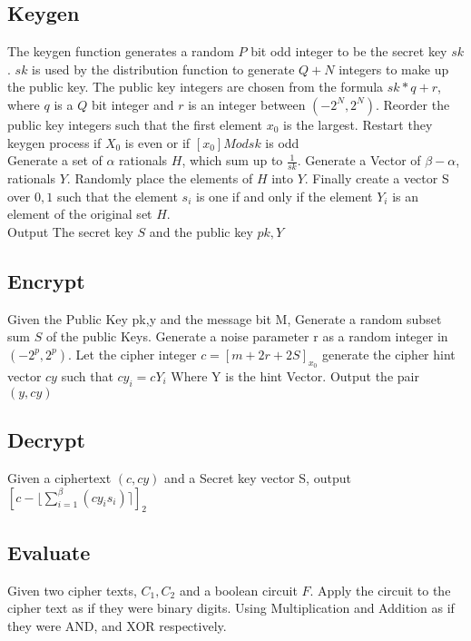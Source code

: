 \documentclass[letterpaper,11pt]{article} %
\begin{document}
\subsection*{Keygen}
The keygen function generates a random $P$ bit odd integer to be the secret key $sk$. $sk$ is used by the distribution function to generate $Q + N$ integers to make up the public key. The public key integers are chosen from
the formula $sk * q + r$, where $q$ is a $Q$ bit integer and $r$ is an integer between $(-2^N, 2^N).$ Reorder the public key integers such that the first element $x_0$ is the largest. Restart they keygen process if $X_0$ is even or if $[x_0] Mod sk$ is odd  \\

Generate a set of $\alpha$ rationals $H$, which sum up to $\frac{1}{sk}$. Generate a Vector of $\beta - \alpha$, rationals $Y.$ Randomly place the elements of $H$ into $Y$. Finally create a vector S over $0,1$ such that the element $s_i$ is one if and only if the element $Y_i$ is an element of the original set $H$.\\

Output The secret key $S$ and the public key $pk,Y$\\

\subsection*{Encrypt}
Given the Public Key pk,y and the message bit M, Generate a random subset sum $S$ of the public Keys. Generate a noise parameter r as a random integer in $(-2^p,2^p)$. Let the cipher integer $c=[m+2r+2S]_{x_0}$ generate the cipher hint vector $cy$ such that $cy_i=cY_i$
Where Y is the hint Vector. Output the pair $(y,cy)$\\

\subsection*{Decrypt}
	Given a ciphertext $(c,cy)$ and a Secret key vector S, output $[c-\lfloor \sum\limits_{i=1}^\beta (cy_is_i) \rceil ]_2$\\
\subsection*{Evaluate}
Given two cipher texts, $C_1, C_2$ and a boolean circuit $F$. Apply the circuit to the cipher text as if they were binary digits. Using Multiplication and Addition as if they were AND, and XOR respectively. 
\end{document}
